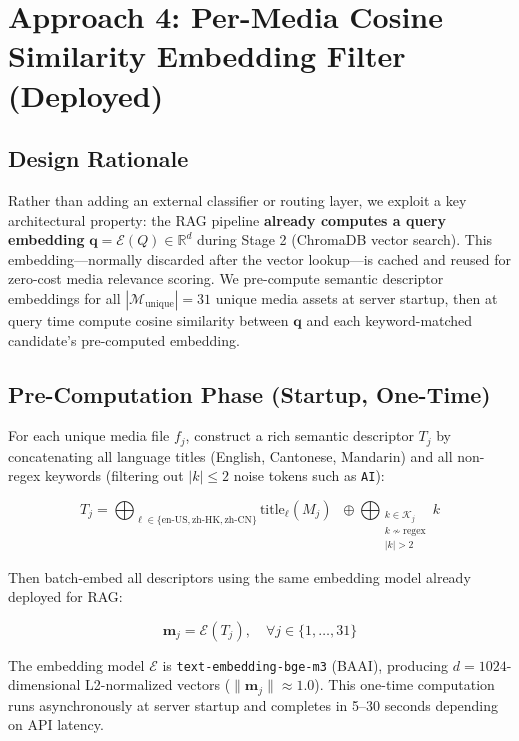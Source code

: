 \documentclass{article}
\begin{document}
\section{Approach 4: Per-Media Cosine Similarity Embedding Filter (Deployed)}

\subsection{Design Rationale}

Rather than adding an external classifier or routing layer, we exploit a key architectural property: the RAG pipeline \textbf{already computes a query embedding} $\mathbf{q} = \mathcal{E}(Q) \in \mathbb{R}^d$ during Stage 2 (ChromaDB vector search). This embedding—normally discarded after the vector lookup—is cached and reused for zero-cost media relevance scoring. We pre-compute semantic descriptor embeddings for all $|\mathcal{M}_{\text{unique}}| = 31$ unique media assets at server startup, then at query time compute cosine similarity between $\mathbf{q}$ and each keyword-matched candidate's pre-computed embedding.

\subsection{Pre-Computation Phase (Startup, One-Time)}

For each unique media file $f_j$, construct a rich semantic descriptor $T_j$ by concatenating all language titles (English, Cantonese, Mandarin) and all non-regex keywords (filtering out $|k| \leq 2$ noise tokens such as \texttt{AI}):

\begin{equation}
T_j = \bigoplus_{\ell \in \{\text{en-US}, \text{zh-HK}, \text{zh-CN}\}} \text{title}_\ell(M_j) \;\; \oplus \bigoplus_{\substack{k \in \mathcal{K}_j \\ k \not\sim \text{regex} \\ |k| > 2}} k
\end{equation}

Then batch-embed all descriptors using the same embedding model already deployed for RAG:

\begin{equation}
\mathbf{m}_j = \mathcal{E}(T_j), \quad \forall j \in \{1, \ldots, 31\}
\end{equation}

The embedding model $\mathcal{E}$ is \texttt{text-embedding-bge-m3} (BAAI), producing $d = 1024$-dimensional L2-normalized vectors ($\|\mathbf{m}_j\| \approx 1.0$). This one-time computation runs asynchronously at server startup and completes in 5--30 seconds depending on API latency.
\end{document}
